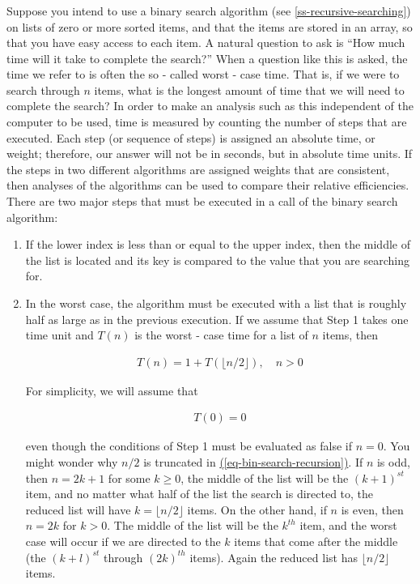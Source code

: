 \documentclass[10pt,]{book}
\theoremstyle{plain}
\theoremstyle{definition}
\theoremstyle{definition}
\theoremstyle{definition}
\theoremstyle{definition}
\numberwithin{equation}{section}
\begin{document}
\subsubsection[ ]{ }\label{subsubsection-1}
 Suppose you intend to use a binary search algorithm (see \hyperref[ss-recursive-searching]{\ref{ss-recursive-searching}}) on lists of zero or more sorted items, and that the items are stored in an array, so that you have easy access to each item. A natural question to ask is ``How much time will it take to complete the search?'' When a question like this is asked, the time we refer to is often the so - called worst - case time. That is, if we were to search through \(n\) items, what is the longest amount of time that we will need to complete the search? In order to make an analysis such as this independent of the computer to be used, time is measured by counting the number of steps that are executed. Each
step (or sequence of steps) is assigned an absolute time, or weight; therefore, our answer will not be in seconds, but in absolute time units. If
the steps in two different algorithms are assigned weights that are consistent, then analyses of the algorithms can be used to compare their relative
efficiencies. There are two major steps that must be executed in a call of the binary search algorithm:%
\par
\leavevmode%
\begin{enumerate}[label=\arabic*]
\item\hypertarget{li-89}{} If the lower index is less than or equal to the upper index, then the middle of the list is located and its key is compared to the value that
you are searching for.%
\item\hypertarget{li-90}{}In the worst case, the algorithm must be executed with a list that is roughly half as large as in the previous execution. If we assume that
Step 1 takes one time unit and \(T(n)\) is the worst - case time for a list of \(n\) items, then

\begin{gather}
T(n)= 1 + T (\lfloor n/2 \rfloor ),  \quad n>0\label{eq-bin-search-recursion}
\end{gather}

For simplicity, we will assume that

\begin{gather}
T(0) = 0\label{eq-bin-search-basis}
\end{gather}


even though the conditions of Step 1 must be evaluated as false if \(n = 0\). You might wonder why \(n/2\) is truncated in \hyperref[eq-bin-search-recursion]{(\ref{eq-bin-search-recursion})}. If \(n\) is
odd, then \(n = 2 k + 1\) for some \(k\geq  0\), the middle of the list will be the \((k + 1)^{st}\)  item, and no matter what half of the list the search is directed to, the reduced list will have \(k = \lfloor n/2\rfloor\) items. On the other hand, if \(n\) is even, then \(n
= 2 k\) { }for \(k>0\). The middle of the list will be the \(k^{th}\) item, and the worst case will occur if we are directed to the \(k\) items
that come after the middle (the \((k + l)^{st}\) through \((2k)^{th}\) items). Again the reduced list has \(\lfloor n/2\rfloor\) items.%
\end{enumerate}
\end{document}
